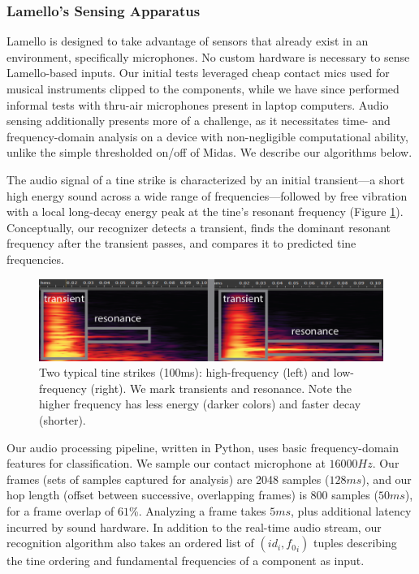    \subsubsection{Lamello's Sensing Apparatus}
    
    Lamello is designed to take advantage of sensors that already exist in an environment, specifically microphones. No custom hardware is necessary to sense Lamello-based inputs. Our initial tests leveraged cheap contact mics used for musical instruments clipped to the components, while we have since performed informal tests with thru-air microphones present in laptop computers. Audio sensing additionally presents more of a challenge, as it necessitates time- and frequency-domain analysis on a device with non-negligible computational ability, unlike the simple thresholded on/off of Midas. We describe our algorithms below.

    The audio signal of a tine strike is characterized by an initial transient---a short high energy sound across a wide range of frequencies---followed by free vibration with a local long-decay energy peak at the tine's resonant frequency (Figure \ref{fig:lamello-transient}). Conceptually, our recognizer detects a transient, finds the dominant resonant frequency after the transient passes, and compares it to predicted tine frequencies.
    
    
\begin{figure}
  \centering
    \includegraphics[width=\textwidth]{figures/lamello/transient-resonance.png}
  \caption{Two typical tine strikes (100ms): high-frequency (left) and low-frequency (right). We mark transients and resonance. Note the higher frequency has less energy (darker colors) and faster decay (shorter).} 
  \label{fig:lamello-transient}
\end{figure}

    Our audio processing pipeline, written in Python, uses basic frequency-domain features for classification. We sample our contact microphone at $16000Hz$. Our frames (sets of samples captured for analysis) are 2048 samples ($128ms$), and our hop length (offset between successive, overlapping frames) is 800 samples ($50ms$), for a frame overlap of $61$\%. Analyzing a frame takes $5ms$, plus additional latency incurred by sound hardware. In addition to the real-time audio stream, our recognition algorithm also takes an ordered list of $(id_i,{f_0}_i)$ tuples describing the tine ordering and fundamental frequencies of a component as input.

